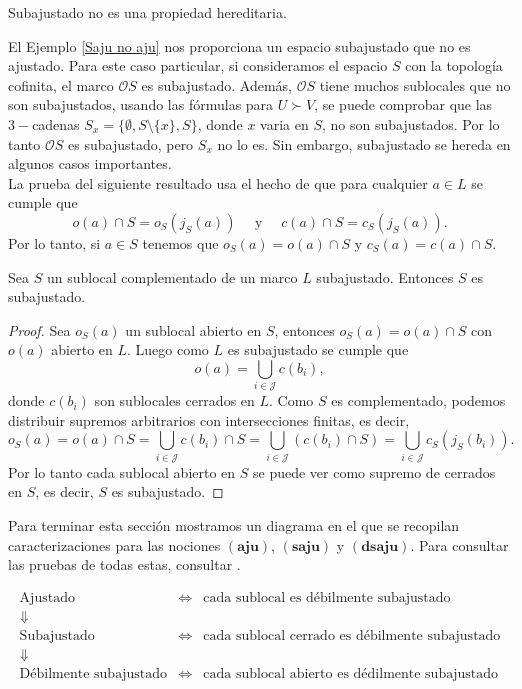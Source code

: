 \documentclass{comunicaciones}
\begin{document}
\begin{cor}\label{saju no saju}
    Subajustado no es una propiedad hereditaria. 
\end{cor}

El Ejemplo \ref{Saju no aju} nos proporciona un espacio subajustado que no es ajustado. Para este caso particular, si consideramos el espacio $S$ con la topología cofinita, el marco $\mathcal{O}S$ es subajustado. Además, $\mathcal{O}S$ tiene muchos sublocales que no son subajustados, usando las fórmulas para $U\succ V$, se puede comprobar que las $3-$cadenas $S_x=\{\emptyset, S\setminus \{x\}, S\}$, donde $x$ varia en $S$, no son subajustados. Por lo tanto $\mathcal{O}S$ es subajustado, pero $S_x$ no lo es. Sin embargo, subajustado se hereda en algunos casos importantes.\\

La prueba del siguiente resultado usa el hecho de que para cualquier $a\in L$ se cumple que 
\[
o(a)\cap S=o_S(j_S(a))\quad\mbox{ y }\quad c(a)\cap S=c_S(j_S(a)).
\]
Por lo tanto, si $a\in S$ tenemos que $o_S(a)=o(a)\cap S$ y $c_S(a)=c(a)\cap S$.

\begin{thm}\label{saju complementado}
    Sea $S$ un sublocal complementado de un marco $L$ subajustado. Entonces $S$ es subajustado.
\end{thm}

\begin{proof}
    Sea $o_S(a)$ un sublocal abierto en $S$, entonces $o_S(a)=o(a)\cap S$ con $o(a)$ abierto en $L$. Luego como $L$ es subajustado se cumple que 
    \[
    o(a)=\bigcup_{i\in \mathcal{J}} c(b_i),
    \]
    donde $c(b_i)$ son sublocales cerrados en $L$. Como $S$ es complementado, podemos distribuir supremos arbitrarios con intersecciones finitas, es decir, 
    \[
    o_S(a)=o(a)\cap S=\bigcup_{i\in \mathcal{J}}c(b_i)\cap S=\bigcup_{i\in \mathcal{J}}(c(b_i)\cap S)=\bigcup_{i\in \mathcal{J}}c_S(j_S(b_i)).
    \]
    Por lo tanto cada sublocal abierto en $S$ se puede ver como supremo de cerrados en $S$, es decir, $S$ es subajustado. 
\end{proof}

Para terminar esta sección mostramos un diagrama en el que se recopilan caracterizaciones para las nociones $\mathbf{(aju)}$, $\mathbf{(saju)}$ y $\mathbf{(dsaju)}$. Para consultar las pruebas de todas estas, consultar \cite{J.P.2}.

\[
\begin{array}{ccl}
   \mbox{Ajustado}  & \Longleftrightarrow & \mbox{cada sublocal es débilmente subajustado}  \\
    \Downarrow &  & \\
   \mbox{Subajustado}  & \Longleftrightarrow & \mbox{cada sublocal cerrado es débilmente subajustado}  \\
    \Downarrow &  & \\
   \mbox{Débilmente subajustado}  & \Longleftrightarrow & \mbox{cada sublocal abierto es dédilmente subajustado}  
\end{array}
\]
\end{document}
